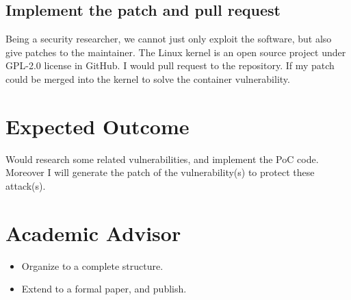 \documentclass[12pt,a4paper,oneside,draft]{IEEEconf}
\begin{document}
\subsection{Implement the patch and pull request}
Being a security researcher, we cannot just only exploit the software, but also give patches to
the maintainer. The Linux kernel is an open source project under GPL-2.0 license in GitHub.
I would pull request to the repository. If my patch could be merged into the kernel to solve the
container vulnerability.

\section{Expected Outcome}
Would research some related vulnerabilities, and implement the PoC code.
Moreover I will generate the patch of the vulnerability(s) to protect these attack(s).

\printbibheading[heading=bibnumbered]
\printbibliography\newrefcontext

\section{Academic Advisor}
\begin{itemize}
  \item Organize to a complete structure.
  \item Extend to a formal paper, and publish.
\end{itemize}
\end{document}
